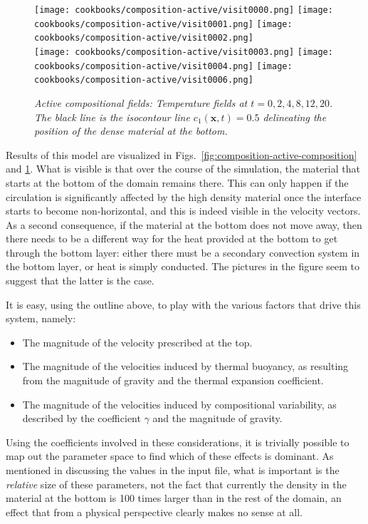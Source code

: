 \documentclass{article}
\begin{document}
\begin{figure}
  \centering
  \texttt{[image: cookbooks/composition-active/visit0000.png]}
  \hfill
  \texttt{[image: cookbooks/composition-active/visit0001.png]}
  \hfill
  \texttt{[image: cookbooks/composition-active/visit0002.png]}
  \\[6pt]
  \texttt{[image: cookbooks/composition-active/visit0003.png]}
  \hfill
  \texttt{[image: cookbooks/composition-active/visit0004.png]}
  \hfill
  \texttt{[image: cookbooks/composition-active/visit0006.png]}
  \caption{\it Active compositional fields: Temperature fields at $t=0, 2, 4, 8,
  12, 20$. The black line is the isocontour line $c_1(\mathbf x,t)=0.5$
    delineating the position of the dense material at the bottom.}
  \label{fig:composition-active-temperature}
\end{figure}

Results of this model are visualized in
Figs.~\ref{fig:composition-active-composition} and \ref{fig:composition-active-temperature}. What is visible is
that over the course of the simulation, the material that starts at the bottom
of the domain remains there. This can only happen if the circulation is
significantly affected by the high density material once the interface starts
to become non-horizontal, and this is
indeed visible in the velocity vectors. As a second consequence, if the
material at the bottom does not move away, then there needs to be a different
way for the heat provided at the bottom to get through the bottom layer:
either there must be a secondary convection system in the bottom layer, or
heat is simply conducted. The pictures in the figure seem to suggest
that the latter is the case.

It is easy, using the
outline above, to play with the various factors that drive this system, namely:
\begin{itemize}
  \item The magnitude of the velocity prescribed at the top.
  \item The magnitude of the velocities induced by thermal buoyancy, as
  resulting from the magnitude of gravity and the thermal expansion coefficient.
  \item The magnitude of the velocities induced by compositional variability, as
  described by the coefficient $\gamma$ and the magnitude of gravity.
\end{itemize}
Using the coefficients involved in these considerations, it is trivially
possible to map out the parameter space to find which of these effects is
dominant. As mentioned in discussing the values in the input file, what is
important is the \textit{relative} size of these parameters, not the fact
that currently the density in the material at the bottom is 100 times larger
than in the rest of the domain, an effect that from a physical perspective
clearly makes no sense at all.
\end{document}
